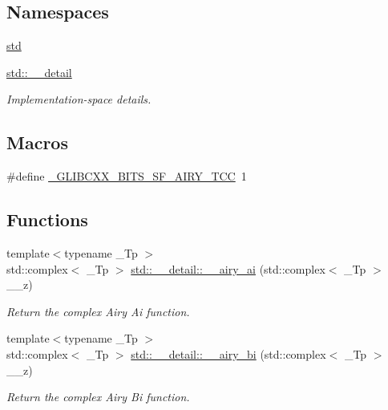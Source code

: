 \subsection*{Namespaces}
\begin{DoxyCompactItemize}
\item 
 \hyperlink{namespacestd}{std}
\item 
 \hyperlink{namespacestd_1_1____detail}{std\+::\+\_\+\+\_\+detail}
\begin{DoxyCompactList}\small\item\em Implementation-\/space details. \end{DoxyCompactList}\end{DoxyCompactItemize}
\subsection*{Macros}
\begin{DoxyCompactItemize}
\item 
\#define \hyperlink{sf__airy_8tcc_a2368d5b1edfb2e14f2c283d87ab89943}{\+\_\+\+G\+L\+I\+B\+C\+X\+X\+\_\+\+B\+I\+T\+S\+\_\+\+S\+F\+\_\+\+A\+I\+R\+Y\+\_\+\+T\+CC}~1
\end{DoxyCompactItemize}
\subsection*{Functions}
\begin{DoxyCompactItemize}
\item 
{\footnotesize template$<$typename \+\_\+\+Tp $>$ }\\std\+::complex$<$ \+\_\+\+Tp $>$ \hyperlink{namespacestd_1_1____detail_afd48b5702344f832a250922ac4ffb917}{std\+::\+\_\+\+\_\+detail\+::\+\_\+\+\_\+airy\+\_\+ai} (std\+::complex$<$ \+\_\+\+Tp $>$ \+\_\+\+\_\+z)
\begin{DoxyCompactList}\small\item\em Return the complex Airy Ai function. \end{DoxyCompactList}\item 
{\footnotesize template$<$typename \+\_\+\+Tp $>$ }\\std\+::complex$<$ \+\_\+\+Tp $>$ \hyperlink{namespacestd_1_1____detail_ae5536305d721e393efe1a74f0e57653e}{std\+::\+\_\+\+\_\+detail\+::\+\_\+\+\_\+airy\+\_\+bi} (std\+::complex$<$ \+\_\+\+Tp $>$ \+\_\+\+\_\+z)
\begin{DoxyCompactList}\small\item\em Return the complex Airy Bi function. \end{DoxyCompactList}\end{DoxyCompactItemize}
